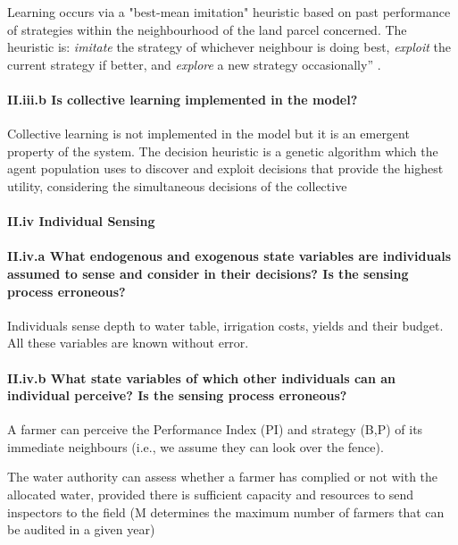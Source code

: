\documentclass[12pt, a4paper]{article}
\begin{document}
Learning occurs via a "best-mean imitation" heuristic \autocite{Gotts:2009td} based on past performance of strategies within the neighbourhood of the land parcel concerned. The heuristic is: \emph{imitate} the strategy of whichever neighbour is doing best, \emph{exploit} the current strategy if better, and \emph{explore} a new strategy occasionally'' \autocite{Gigerenzer:2002tn}.

\paragraph{II.iii.b Is collective learning implemented in the model?}

Collective learning is not implemented in the model but it is an emergent property of the system. The decision heuristic is a genetic algorithm which the agent population uses to discover and exploit decisions that provide the highest utility, considering the simultaneous decisions of the collective

\paragraph{II.iv Individual Sensing}

\paragraph{II.iv.a What endogenous and exogenous state variables are individuals assumed to sense and consider in their decisions? Is the sensing process erroneous?}

Individuals sense depth to water table, irrigation costs, yields and their budget. All these variables are known without error.

\paragraph{II.iv.b What state variables of which other individuals can an individual perceive? Is the sensing process erroneous?}

A farmer can perceive the Performance Index (PI) and strategy (B,P) of its immediate neighbours (i.e., we assume they can look over the fence).

The water authority can assess whether a farmer has complied or not with the allocated water, provided there is sufficient capacity and resources to send inspectors to the field (M determines the maximum number of farmers that can be audited in a given year)
\end{document}
